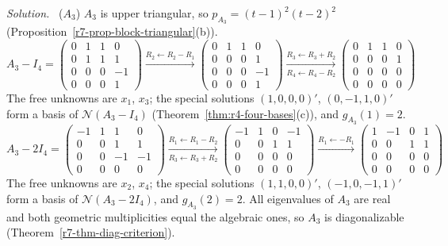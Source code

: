 \documentclass[12pt]{article}
\theoremstyle{definition}
\newenvironment{solution}{\par\noindent\textit{Solution.}\ }{\par\smallskip}
\begin{document}
\begin{solution}
(\(A_3\)) \(A_3\) is upper triangular, so \(p_{A_3}=(t-1)^2(t-2)^2\) (Proposition~\ref{r7-prop-block-triangular}(b)).
\[
A_3-I_4=\begin{pmatrix}0&1&1&0\\0&1&1&1\\0&0&0&-1\\0&0&0&1\end{pmatrix}
\xrightarrow{R_2\leftarrow R_2-R_1}
\begin{pmatrix}0&1&1&0\\0&0&0&1\\0&0&0&-1\\0&0&0&1\end{pmatrix}
\xrightarrow[R_4\leftarrow R_4-R_2]{R_3\leftarrow R_3+R_2}
\begin{pmatrix}0&1&1&0\\0&0&0&1\\0&0&0&0\\0&0&0&0\end{pmatrix}
\]
The free unknowns are \(x_1\), \(x_3\); the special solutions \((1,0,0,0)'\), \((0,-1,1,0)'\) form a basis of
\(\mathcal N(A_3-I_4)\) (Theorem~\ref{thm:r4-four-bases}(c)), and \(g_{A_3}(1)=2\).
\[
A_3-2I_4=\begin{pmatrix}-1&1&1&0\\0&0&1&1\\0&0&-1&-1\\0&0&0&0\end{pmatrix}
\xrightarrow[R_3\leftarrow R_3+R_2]{R_1\leftarrow R_1-R_2}
\begin{pmatrix}-1&1&0&-1\\0&0&1&1\\0&0&0&0\\0&0&0&0\end{pmatrix}
\xrightarrow{R_1\leftarrow-R_1}
\begin{pmatrix}1&-1&0&1\\0&0&1&1\\0&0&0&0\\0&0&0&0\end{pmatrix}
\]
The free unknowns are \(x_2\), \(x_4\); the special solutions \((1,1,0,0)'\), \((-1,0,-1,1)'\) form a basis of
\(\mathcal N(A_3-2I_4)\), and \(g_{A_3}(2)=2\). All eigenvalues of \(A_3\) are real and both geometric multiplicities
equal the algebraic ones, so \(A_3\) is diagonalizable (Theorem~\ref{r7-thm-diag-criterion}).
\end{solution}
\end{document}
